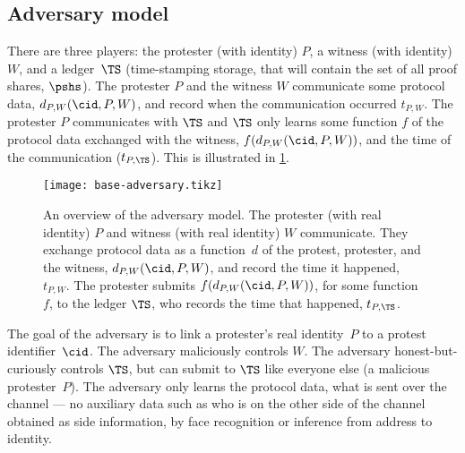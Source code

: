 \subsection{Adversary model}%
\label{formal-adversary-model}

There are three players: the protester (with identity) \(P\), a witness (with 
identity) \(W\), and a ledger~\(\TS\) (\ie time-stamping storage, that will 
contain the set of all proof shares, \(\pshs\)).
The protester \(P\) and the witness \(W\) communicate some protocol data,
\(d_{P,W}(\cid, P, W)\), and record when the communication occurred 
\(t_{P,W}\).
The protester \(P\) communicates with \(\TS\) and \(\TS\) only learns 
some function \(f\) of the protocol data exchanged with the witness,
\(f(d_{P,W}(\cid, P, W))\), and the time of the communication (\(t_{P,\TS}\)).
This is illustrated in \cref{fig:base-adversary}.

\begin{figure}
  \centering
  \texttt{[image: base-adversary.tikz]}
  \caption{\label{fig:base-adversary}%
    An overview of the adversary model.
    The protester (with real identity) \(P\) and witness (with real identity) 
    \(W\) communicate.
    They exchange protocol data as a function~\(d\) of the protest, protester, 
    and the witness, \(d_{P,W}(\cid, P, W)\), and record the time it happened, 
    \(t_{P,W}\).
    The protester submits \(f(d_{P,W}(\cid, P, W))\), for some function \(f\), 
    to the ledger \(\TS\), who records the time that happened, \(t_{P,\TS}\).
  }
\end{figure}

The goal of the adversary is to link a protester's real identity~\(P\) to a 
protest identifier~\(\cid\).
The adversary maliciously controls \(W\).
The adversary honest-but-curiously controls \(\TS\), but can submit to \(\TS\) 
like everyone else (\eg a malicious protester~\(P\)).
The adversary only learns the protocol data, \ie what is sent over the channel 
--- no auxiliary data such as who is on the other side of the channel obtained
  as side information, \eg by face recognition or inference from address
  to identity.

